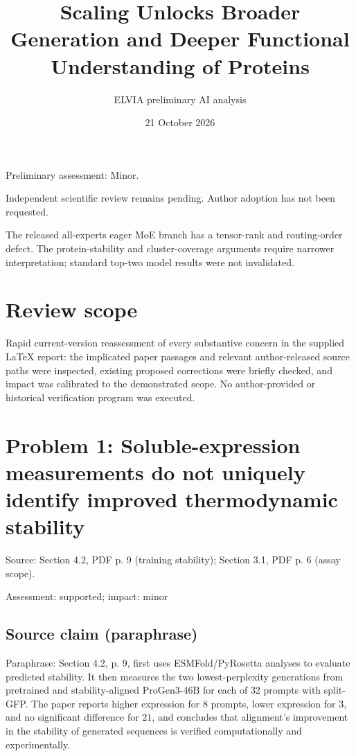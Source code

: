 \documentclass[11pt]{article}
\begin{document}
\title{Scaling Unlocks Broader Generation and Deeper Functional Understanding of Proteins}

\author{ELVIA preliminary AI analysis}\date{21 October 2026}\maketitle

Preliminary assessment: Minor.\par

Independent scientific review remains pending. Author adoption has not been requested.

The released all-experts eager MoE branch has a tensor-rank and routing-order defect. The protein-stability and cluster-coverage arguments require narrower interpretation; standard top-two model results were not invalidated.

\section*{Review scope}

Rapid current-version reassessment of every substantive concern in the supplied LaTeX report: the implicated paper passages and relevant author-released source paths were inspected, existing proposed corrections were briefly checked, and impact was calibrated to the demonstrated scope. No author-provided or historical verification program was executed.

\section*{Problem 1: Soluble-expression measurements do not uniquely identify improved thermodynamic stability}

Source: Section 4.2, PDF p. 9 (training stability); Section 3.1, PDF p. 6 (assay scope).

Assessment: supported; impact: minor

\subsection*{Source claim (paraphrase)}

Paraphrase: Section 4.2, p. 9, first uses ESMFold/PyRosetta analyses to evaluate predicted stability. It then measures the two lowest-perplexity generations from pretrained and stability-aligned ProGen3-46B for each of \(32\) prompts with split-GFP. The paper reports higher expression for \(8\) prompts, lower expression for \(3\), and no significant difference for \(21\), and concludes that alignment’s improvement in the stability of generated sequences is verified computationally and experimentally.
\end{document}
